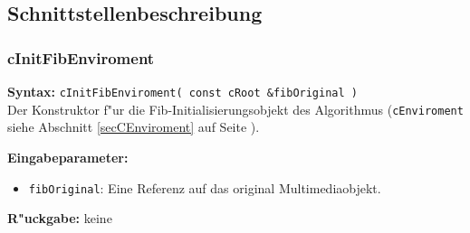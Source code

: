 \subsection{Schnittstellenbeschreibung}

\subsubsection{cInitFibEnviroment}

\textbf{Syntax:} \verb|cInitFibEnviroment( const cRoot &fibOriginal )| \\

Der Konstruktor f"ur die Fib-Initialisierungsobjekt des Algorithmus (\verb|cEnviroment| siehe Abschnitt \ref{secCEnviroment} auf Seite \pageref{secCEnviroment}).

\bigskip\noindent
\textbf{Eingabeparameter:}
\begin{itemize}
 \item \verb|fibOriginal|: Eine Referenz auf das original Multimediaobjekt.
\end{itemize}

\bigskip\noindent
\textbf{R"uckgabe:} keine

%
%
%
%


